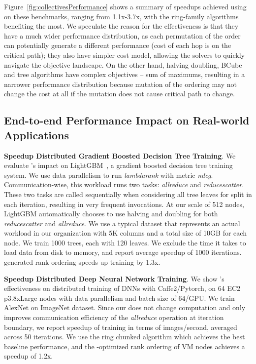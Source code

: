 Figure~\ref{fig:collectivesPerformance} shows a summary of speedups achieved using \cmpi on these benchmarks, ranging from 1.1x-3.7x, with the ring-family algorithms benefiting the most. We speculate the reason for the effectiveness is that they have a much wider performance distribution, as each permutation of the order can potentially generate a different performance (cost of each hop is on the critical path); they also have simpler cost model, allowing the solvers to quickly navigate the objective landscape. On the other hand, halving doubling, BCube and tree algorithms have complex objectives -- sum of maximums, resulting in a narrower performance distribution because mutation of the ordering may not change the cost at all if the mutation does not cause critical path to change. %

\subsection{End-to-end Performance Impact on Real-world Applications}
\noindent \textbf{Speedup Distributed Gradient Boosted Decision Tree Training}. We evaluate \cmpi{}'s impact on LightGBM~\cite{Ke2017LightGBMAH}, a gradient boosted decision tree training system. We use data parallelism to run \textit{lambdarank} with metric \textit{ndcg}. Communication-wise, this workload runs two \collectives tasks: \textit{allreduce} and \textit{reducescatter}. %
These two tasks are called sequentially when considering all tree leaves for split in each iteration, resulting in very frequent invocations. At our scale of 512 nodes, LightGBM automatically chooses to use halving and doubling for both \textit{reducescatter} and \textit{allreduce}. We use a typical dataset that represents an actual workload in our organization with 5K columns and a total size of 10GB for each node. We train 1000 trees, each with 120 leaves. We exclude the time it takes to load data from disk to memory, and report average speedup of 1000 iterations. \cmpi generated rank ordering speeds up training by 1.3x.

\noindent \textbf{Speedup Distributed Deep Neural Network Training}. We show \cmpi{}'s effectiveness on distributed training of DNNs with Caffe2/Pytorch, on 64 EC2 p3.8xLarge nodes with data parallelism and batch size of 64/GPU. We train AlexNet on ImageNet dataset. Since our \cmpi{} does not change computation and only improves communication efficiency of the \textit{allreduce} operation at iteration boundary, we report speedup of training in terms of images/second, averaged across 50 iterations. We use the ring chunked algorithm which achieves the best baseline performance, and the \cmpi{}-optimized rank ordering of VM nodes achieves a speedup of 1.2x.

